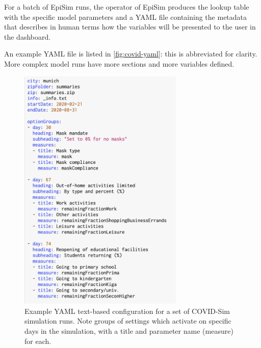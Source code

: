 For a batch of EpiSim runs, the operator of EpiSim produces the lookup table with the specific model parameters and a YAML file containing the metadata that describes in human terms how the variables will be presented to the user in the dashboard.

An example YAML file is listed in \autoref{fig:covid-yaml}: this is abbreviated for clarity. More complex model runs have more sections and more variables defined.

\begin{figure}
  \centering
	\begin{minipage}{0.9\textwidth}
    \centering
    \includegraphics[width=0.7\textwidth]{chapters/21-covid-sim/images/covid-yaml.png}
  \caption{Example YAML text-based configuration for a set of COVID-Sim simulation runs. Note groups of settings which activate on specific days in the simulation, with a title and parameter name (measure) for each.}
  \label{fig:covid-yaml}
	\end{minipage}
\end{figure}


